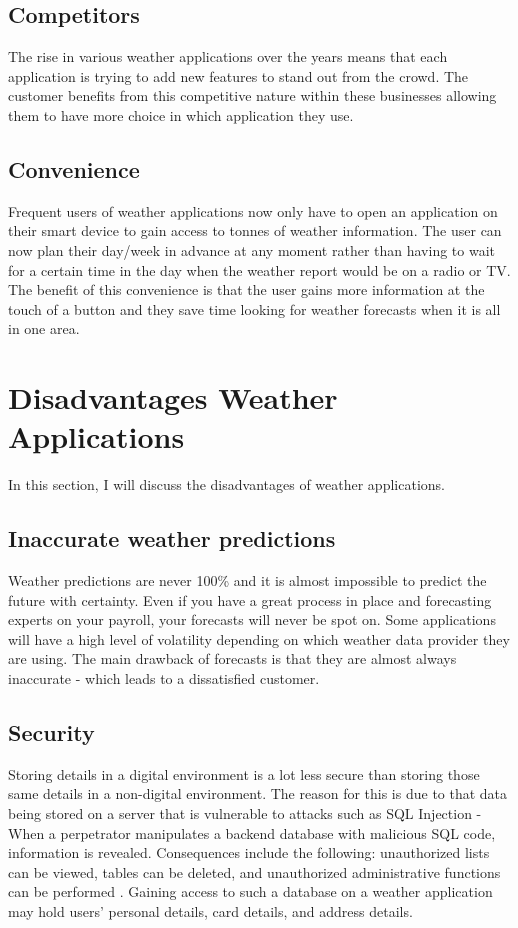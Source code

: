 \subsection{Competitors}

The rise in various weather applications over the years means that each application is trying to add new features to stand out from the crowd. The customer benefits from this competitive nature within these businesses allowing them to have more choice in which application they use. 
\subsection{Convenience}
Frequent users of weather applications now only have to open an application on their smart device to gain access to tonnes of weather information. The user can now plan their day/week in advance at any moment rather than having to wait for a certain time in the day when the weather report would be on a radio or TV. The benefit of this convenience is that the user gains more information at the touch of a button and they save time looking for weather forecasts when it is all in one area.

\section{Disadvantages Weather Applications}
In this section, I will discuss the disadvantages of weather applications.

\subsection{Inaccurate weather predictions}

Weather predictions are never 100\% and it is almost impossible to predict the future with certainty. Even if you have a great process in place and forecasting experts on your payroll, your forecasts will never be spot on. Some applications will have a high level of volatility depending on which weather data provider they are using. The main drawback of forecasts is that they are almost always inaccurate - which leads to a dissatisfied customer.

\subsection{Security}

Storing details in a digital environment is a lot less secure than storing those same details in a non-digital environment. The reason for this is due to that data being stored on a server that is vulnerable to attacks such as SQL Injection - When a perpetrator manipulates a backend database with malicious SQL code, information is revealed. Consequences include the following: unauthorized lists can be viewed, tables can be deleted, and unauthorized administrative functions can be performed \cite{sqlInjection}. Gaining access to such a database on a weather application may hold users' personal details, card details, and address details.

